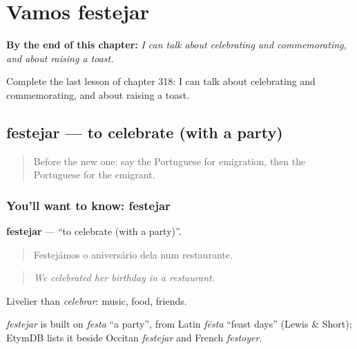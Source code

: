
\chapter{Vamos festejar}
\label{ch:pt-vamos-festejar}

\begin{chapteropening}
\textbf{By the end of this chapter:} \emph{I can talk about celebrating and commemorating, and about raising a toast.}

Complete the last lesson of chapter 318: I can talk about celebrating and commemorating, and about raising a toast.
\end{chapteropening}

\section[festejar]{festejar — to celebrate (with a party)}

\label{lesson:PT-C318-festejar}



\begin{quote}
Before the new one: say the Portuguese for emigration, then the Portuguese for the emigrant.
\end{quote}

\subsection*{You'll want to know: festejar}
\textbf{festejar} — \textquotedblleft{}to celebrate (with a party)\textquotedblright{}.

\begin{quote}
Festejámos o aniversário dela num restaurante.
\end{quote}

\begin{quote}
\emph{We celebrated her birthday in a restaurant.}
\end{quote}

Livelier than \emph{celebrar}: music, food, friends.

\begin{cousinweb}
\emph{festejar} is built on \emph{festa} \textquotedblleft{}a party\textquotedblright{}, from Latin \emph{fēsta} \textquotedblleft{}feast days\textquotedblright{} (Lewis \& Short); EtymDB lists it beside Occitan \emph{festejar} and French \emph{festoyer}.
\end{cousinweb}

